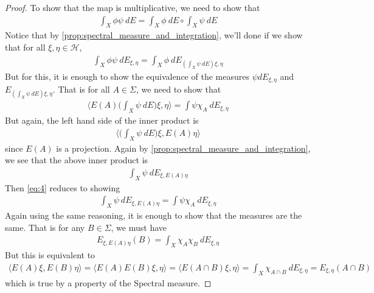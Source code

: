 \begin{proof}
  To show that the map is multiplicative, we need to show that
  \begin{align*}
    \int_X \phi \psi \ d  E = \int_X \phi \ d  E \circ \int_X \psi \ d  E
  \end{align*}
  Notice that by \autoref{prop:spectral_measure_and_integration}, we'll
  done if we show that for all $\xi, \eta \in \mathcal{H}$,
  \begin{align*}
    \int_X \phi \psi \ d E_{\xi, \eta} = \int_X \phi \ d  E_{(\int_X
    \psi \ d E) \xi, \eta}
  \end{align*}
  But for this, it is enough to show the equivalence of the measures
  $\psi dE_{\xi, \eta}$ and $E_{(\int_X \psi \ d E)\xi, \eta }$. That
  is for all $A \in \Sigma$, we need to show that
  \begin{align}
    \label{eq:4}
    \Big \langle E(A)\Big(\int_X  \psi \ d  E\Big)\xi ,  \eta \Big
    \rangle = \int \psi \chi_A \ d  E_{\xi, \eta}
  \end{align}
  But again, the left hand side of the inner product is
  \begin{align*}
    \Big \langle \Big( \int_X \psi \ d E\Big) \xi ,  E(A) \eta \Big \rangle
  \end{align*}
  since $E(A)$ is a projection. Again by
  \autoref{prop:spectral_measure_and_integration}, we see that the
  above inner product is
  \begin{align*}
    \int_X \psi \ d E_{\xi, E(A) \eta}
  \end{align*}
  Then \autoref{eq:4} reduces to showing
  \begin{align*}
    \int_X \psi \ d E_{\xi, E(A) \eta} = \int \psi \chi_A \ d  E_{\xi, \eta}
  \end{align*}
  Again using the same reasoning, it is enough to show that the
  measures are the same. That is for any $B \in \Sigma$, we must have
  \begin{align*}
    E_{\xi , E(A) \eta}(B) =     \int_X \chi_A \chi_B \ dE_{\xi, \eta}
  \end{align*}
  But this is equivalent to
  \begin{align*}
    \langle E(A) \xi ,  E(B) \eta \rangle = \langle E(A)E(B) \xi ,
    \eta \rangle =  \langle  E(A \cap B) \xi , \eta \rangle = \int_X
    \chi_{A\cap B} \ d E_{ \xi, \eta} = E_{\xi, \eta}(A \cap B)
  \end{align*}
  which is true by a property of the Spectral measure.
\end{proof}

